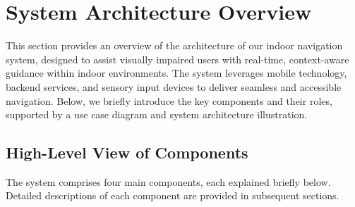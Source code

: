 \section{System Architecture Overview}

This section provides an overview of the architecture of our indoor navigation system, designed to assist visually impaired users with real-time, context-aware guidance within indoor environments. The system leverages mobile technology, backend services, and sensory input devices to deliver seamless and accessible navigation. Below, we briefly introduce the key components and their roles, supported by a use case diagram and system architecture illustration.

\subsection{High-Level View of Components}

The system comprises four main components, each explained briefly below. Detailed descriptions of each component are provided in subsequent sections.

